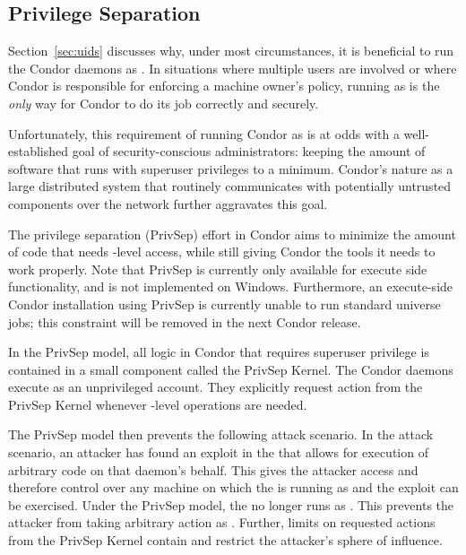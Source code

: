\subsection{\label{sec:PrivSep}Privilege Separation}

Section~\ref{sec:uids} discusses why, under most circumstances, it is
beneficial to run the Condor daemons as . In situations
where multiple users are involved or where Condor is responsible for
enforcing a machine owner's policy, running as  is the 
\emph{only} way for Condor to do its job correctly and securely.

Unfortunately, this requirement of running Condor as  is
at odds with a well-established goal of security-conscious
administrators: keeping the amount of software that runs with
superuser privileges to a minimum. Condor's nature as a
large distributed system that routinely communicates with potentially
untrusted components over the network further aggravates this goal.

The privilege separation (PrivSep) effort in Condor aims to minimize
the amount of code that needs -level access, while still
giving Condor the tools it needs to work properly. Note that PrivSep
is currently only available for execute side functionality, and is not
implemented on Windows. Furthermore, an execute-side Condor installation
using PrivSep is currently unable to run standard universe jobs; this
constraint will be removed in the next Condor release.

In the PrivSep model, all logic in Condor that requires superuser
privilege is contained in a small component called 
the PrivSep Kernel.
The Condor daemons execute as an unprivileged account.
They explicitly request action from the PrivSep Kernel whenever
-level operations are needed.

The PrivSep model then prevents the following attack scenario.
In the attack scenario, an attacker has found an exploit in the
 that allows for execution of arbitrary code on that
daemon's behalf. 
This gives the attacker  access and therefore
control over any machine
on which the  is running as 
and the exploit can be exercised.
Under the PrivSep model,
the  no longer runs as .
This prevents the attacker from taking arbitrary action as . 
Further, limits on requested actions from the PrivSep Kernel
contain and restrict the attacker's sphere of influence.

